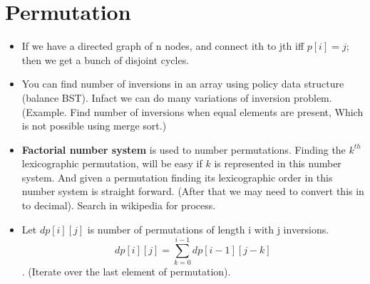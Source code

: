 \documentclass[../Notes.tex]{subfiles}
\begin{document}
\section{Permutation}
\begin{itemize}
	\item If we have a directed graph of n nodes, and connect ith to jth iff $p[i]=j$; then we get a bunch of disjoint cycles.
	\item You can find number of inversions in an array using policy data structure (balance BST). Infact we can do many variations of inversion problem. (Example. Find number of inversions when equal elements are present, Which is not possible using merge sort.)
	\item \textbf{Factorial number system} is used to number permutations. Finding the $k^{th}$ lexicographic permutation, will be easy if $k$ is represented in this number system. And given a permutation finding its lexicographic order in this number system is straight forward. (After that we may need to convert this in to decimal). Search in wikipedia for process.
	\item Let $dp[i][j]$ is number of permutations of length i with j inversions. $$dp[i][j] = \sum_{k=0}^{i-1}dp[i-1][j-k]$$. (Iterate over the last element of permutation).
\end{itemize}
\end{document}
